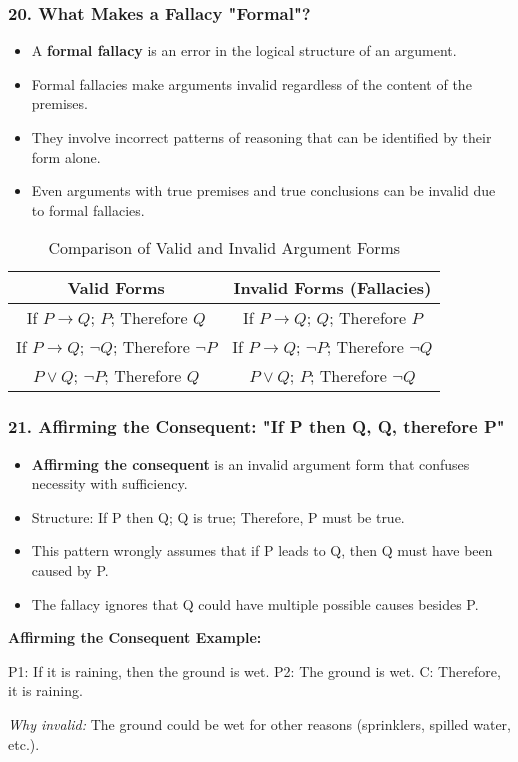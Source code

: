 \documentclass{beamer}
\begin{document}
\begin{frame}
\frametitle{20. What Makes a Fallacy "Formal"?}
\begin{itemize}
\item A \textbf{formal fallacy} is an error in the logical structure of an argument.
\item Formal fallacies make arguments invalid regardless of the content of the premises.
\item They involve incorrect patterns of reasoning that can be identified by their form alone.
\item Even arguments with true premises and true conclusions can be invalid due to formal fallacies.
\end{itemize}

\begin{table}
\centering
\begin{tabular}{|c|c|}
\hline
\textbf{Valid Forms} & \textbf{Invalid Forms (Fallacies)} \\
\hline
If $P \rightarrow Q$; $P$; Therefore $Q$ & If $P \rightarrow Q$; $Q$; Therefore $P$ \\
If $P \rightarrow Q$; $\neg Q$; Therefore $\neg P$ & If $P \rightarrow Q$; $\neg P$; Therefore $\neg Q$ \\
$P \lor Q$; $\neg P$; Therefore $Q$ & $P \lor Q$; $P$; Therefore $\neg Q$ \\
\hline
\end{tabular}
\caption{Comparison of Valid and Invalid Argument Forms}
\end{table}
\end{frame}

\begin{frame}
\frametitle{21. Affirming the Consequent: "If P then Q, Q, therefore P"}
\begin{itemize}
\item \textbf{Affirming the consequent} is an invalid argument form that confuses necessity with sufficiency.
\item Structure: If P then Q; Q is true; Therefore, P must be true.
\item This pattern wrongly assumes that if P leads to Q, then Q must have been caused by P.
\item The fallacy ignores that Q could have multiple possible causes besides P.
\end{itemize}

\begin{example}
\textbf{Affirming the Consequent Example:}

P1: If it is raining, then the ground is wet.
P2: The ground is wet.
C: Therefore, it is raining.

\textit{Why invalid:} The ground could be wet for other reasons (sprinklers, spilled water, etc.).
\end{example}
\end{frame}
\end{document}
